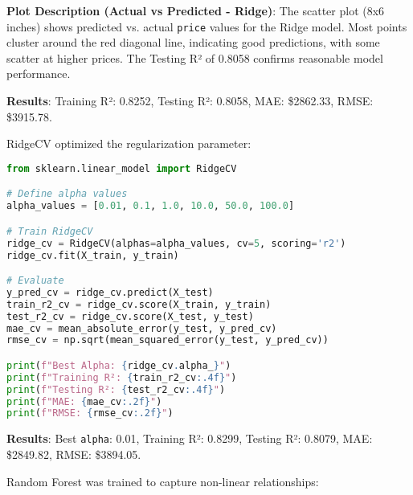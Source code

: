 \documentclass[12pt]{article}
\begin{document}
\textbf{Plot Description (Actual vs Predicted - Ridge)}: The scatter plot (8x6 inches) shows predicted vs. actual \texttt{price} values for the Ridge model. Most points cluster around the red diagonal line, indicating good predictions, with some scatter at higher prices. The Testing R² of 0.8058 confirms reasonable model performance.

\textbf{Results}: Training R²: 0.8252, Testing R²: 0.8058, MAE: \$2862.33, RMSE: \$3915.78.

RidgeCV optimized the regularization parameter:

\begin{lstlisting}[language=Python, caption=RidgeCV Code]
from sklearn.linear_model import RidgeCV

# Define alpha values
alpha_values = [0.01, 0.1, 1.0, 10.0, 50.0, 100.0]

# Train RidgeCV
ridge_cv = RidgeCV(alphas=alpha_values, cv=5, scoring='r2')
ridge_cv.fit(X_train, y_train)

# Evaluate
y_pred_cv = ridge_cv.predict(X_test)
train_r2_cv = ridge_cv.score(X_train, y_train)
test_r2_cv = ridge_cv.score(X_test, y_test)
mae_cv = mean_absolute_error(y_test, y_pred_cv)
rmse_cv = np.sqrt(mean_squared_error(y_test, y_pred_cv))

print(f"Best Alpha: {ridge_cv.alpha_}")
print(f"Training R²: {train_r2_cv:.4f}")
print(f"Testing R²: {test_r2_cv:.4f}")
print(f"MAE: {mae_cv:.2f}")
print(f"RMSE: {rmse_cv:.2f}")
\end{lstlisting}

\textbf{Results}: Best \texttt{alpha}: 0.01, Training R²: 0.8299, Testing R²: 0.8079, MAE: \$2849.82, RMSE: \$3894.05.

Random Forest was trained to capture non-linear relationships:
\end{document}
